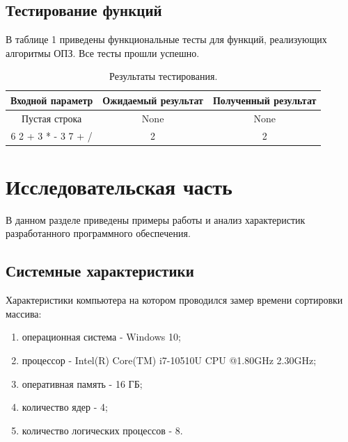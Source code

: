 \documentclass[a4paper, 12pt]{article}
\begin{document}
	\subsection{Тестирование функций}
	\hspace*{5mm} В таблице 1 приведены функциональные тесты для функций, реализующих алгоритмы ОПЗ.
	Все тесты прошли успешно.\\
	\begin{table}[h]
		\centering
		\caption{Результаты тестирования.\\}
		\begin{tabular}{ | c | c | c |}
			\hline
			Входной параметр & Ожидаемый результат & Полученный результат  \\ \hline
			Пустая строка & None &  None\\ \hline
			6 2 + 3 * - 3 7 + / & 2 &  2\\ \hline
		\end{tabular}
	\end{table}
	 
	

\clearpage
\newpage
\section{Исследовательская часть }

	\hspace*{5mm} В данном разделе приведены примеры работы и анализ характеристик разработанного программного обеспечения.
	\subsection{Системные характеристики}
	Характеристики компьютера на котором проводился замер времени сортировки массива:
	\begin{enumerate}
		\item операционная система - Windows 10;
		\item процессор - Intel(R) Core(TM) i7-10510U CPU @1.80GHz 2.30GHz;
		\item оперативная память - 16 ГБ;
		\item количество ядер - 4;
		\item количество логических процессов - 8.
	\end{enumerate}
\end{document}
